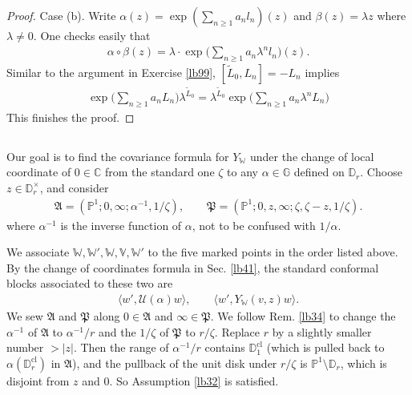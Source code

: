 \documentclass[12pt,a4paper,notitlepage]{article}
\theoremstyle{definition}
\theoremstyle{plain}
\newcommand{\fk}{\mathfrak}
\newcommand{\mc}{\mathcal}
\newcommand{\wtd}{\widetilde}
\newcommand{\bk}[1]{\langle {#1}\rangle}
\newcommand{\Vbb}{\mathbb V}
\newcommand{\Wbb}{\mathbb W}
\newcommand{\Gbb}{\mathbb G}
\newcommand{\Cbb}{\mathbb C}
\newcommand{\Pbb}{\mathbb P}
\newcommand{\Dbb}{\mathbb D}
\newcommand{\cl}{\mathrm{cl}}
\numberwithin{equation}{section}
\begin{document}
\begin{proof}
Case (b). Write $\alpha(z)=\exp(\sum_{n\geq 1} a_nl_n)(z)$ and $\beta(z)=\lambda z$ where $\lambda\neq0$. One checks easily that
\begin{align*}
\alpha\circ\beta(z)=\lambda\cdot \exp\Big(\sum_{n\geq 1}a_n\lambda^nl_n\Big)(z).	
\end{align*}
Similar to the argument in Exercise \ref{lb99},  $[\wtd L_0,L_n]=-L_n$ implies
\begin{align*}
\exp\Big(\sum_{n\geq 1} a_nL_n\Big)\lambda^{\wtd L_0}=\lambda^{\wtd L_0}\exp\Big(\sum_{n\geq 1} a_n\lambda^nL_n\Big)	
\end{align*}
This finishes the proof.
\end{proof}







\subsection{}

Our goal is to find the covariance formula for $Y_\Wbb$ under the change of local coordinate of $0\in\Cbb$ from the standard one $\zeta$ to any $\alpha\in\Gbb$ defined on $\Dbb_r$. Choose $z\in\Dbb_r^\times$, and consider
\begin{align}
\fk A=(\Pbb^1;0,\infty;\alpha^{-1},1/\zeta),\qquad \fk P=(\Pbb^1;0,z,\infty;\zeta,\zeta-z,1/\zeta).	
\end{align}
where $\alpha^{-1}$ is the inverse function of $\alpha$, not to be confused with $1/\alpha$.

We associate $\Wbb,\Wbb',\Wbb,\Vbb,\Wbb'$ to the five marked points in the order listed above. By the change of coordinates formula in Sec. \ref{lb41}, the standard conformal blocks associated to these two are
\begin{align}
\bk{w',\mc U(\alpha)w},\qquad \bk{w',Y_\Wbb(v,z)w}.	\label{eq155}
\end{align}
We sew $\fk A$ and $\fk P$ along $0\in\fk A$ and $\infty\in\fk P$. We follow Rem. \ref{lb34} to change the $\alpha^{-1}$ of $\fk A$ to $\alpha^{-1}/r$ and the $1/\zeta$ of $\fk P$ to $r/\zeta$. Replace $r$ by a slightly smaller number $>|z|$. Then the range of $\alpha^{-1}/r$ contains $\Dbb_1^\cl$ (which is pulled back to $\alpha(\Dbb_r^\cl)$ in $\fk A$), and the pullback of the unit  disk under $r/\zeta$ is $\Pbb^1\setminus\Dbb_r$, which is disjoint from $z$ and $0$. So Assumption \ref{lb32} is satisfied.
\end{document}
